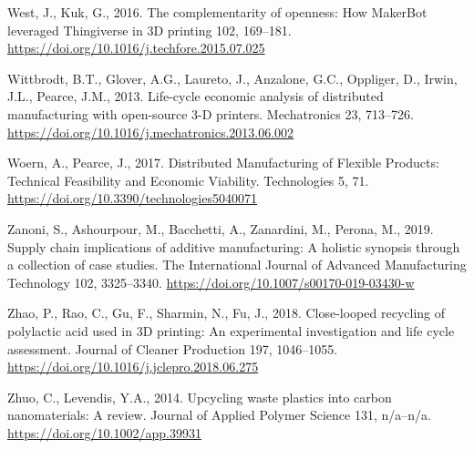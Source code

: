 \documentclass[
  11pt,
]{article}
\newlength{\cslhangindent}
\newlength{\cslentryspacingunit} %
\newenvironment{CSLReferences}[2] %
 {%
  \setlength{\parindent}{0pt}
  \ifodd #1
  \let\oldpar\par
  \def\par{\hangindent=\cslhangindent\oldpar}
  \fi
  \setlength{\parskip}{#2\cslentryspacingunit}
 }%
 {}
\begin{document}
\begin{CSLReferences}{1}{0}
\leavevmode{}%
West, J., Kuk, G., 2016. The complementarity of openness: {How MakerBot}
leveraged {Thingiverse} in {3D} printing 102, 169--181.
\url{https://doi.org/10.1016/j.techfore.2015.07.025}

\leavevmode{}%
Wittbrodt, B.T., Glover, A.G., Laureto, J., Anzalone, G.C., Oppliger,
D., Irwin, J.L., Pearce, J.M., 2013. Life-cycle economic analysis of
distributed manufacturing with open-source 3-{D} printers. Mechatronics
23, 713--726. \url{https://doi.org/10.1016/j.mechatronics.2013.06.002}

\leavevmode{}%
Woern, A., Pearce, J., 2017. Distributed {Manufacturing} of {Flexible
Products}: {Technical Feasibility} and {Economic Viability}.
Technologies 5, 71. \url{https://doi.org/10.3390/technologies5040071}

\leavevmode{}%
Zanoni, S., Ashourpour, M., Bacchetti, A., Zanardini, M., Perona, M.,
2019. Supply chain implications of additive manufacturing: A holistic
synopsis through a collection of case studies. The International Journal
of Advanced Manufacturing Technology 102, 3325--3340.
\url{https://doi.org/10.1007/s00170-019-03430-w}

\leavevmode{}%
Zhao, P., Rao, C., Gu, F., Sharmin, N., Fu, J., 2018. Close-looped
recycling of polylactic acid used in {3D} printing: {An} experimental
investigation and life cycle assessment. Journal of Cleaner Production
197, 1046--1055. \url{https://doi.org/10.1016/j.jclepro.2018.06.275}

\leavevmode{}%
Zhuo, C., Levendis, Y.A., 2014. Upcycling waste plastics into carbon
nanomaterials: {A} review. Journal of Applied Polymer Science 131,
n/a--n/a. \url{https://doi.org/10.1002/app.39931}

\end{CSLReferences}
\end{document}
